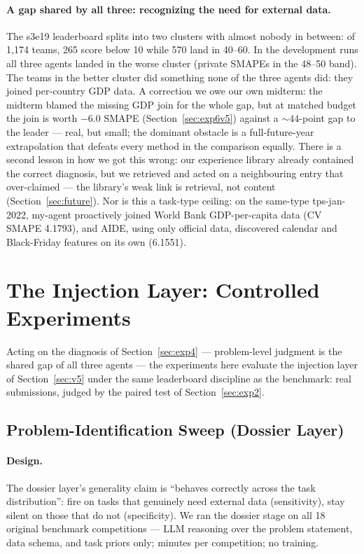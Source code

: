 \documentclass[11pt,a4paper]{article}
\begin{document}
\paragraph{A gap shared by all three: recognizing the need for external data.}
\label{sec:external}
The s3e19 leaderboard splits into two clusters with almost nobody in between: of 1{,}174 teams, 265 score below 10 while 570 land in 40--60. In the development runs all three agents landed in the worse cluster (private SMAPEs in the 48--50 band). The teams in the better cluster did something none of the three agents did: they joined per-country GDP data. A correction we owe our own midterm: the midterm blamed the missing GDP join for the whole gap, but at matched budget the join is worth $-6.0$ SMAPE (Section~\ref{sec:exp6v5}) against a ${\sim}44$-point gap to the leader --- real, but small; the dominant obstacle is a full-future-year extrapolation that defeats every method in the comparison equally. There is a second lesson in how we got this wrong: our experience library already contained the correct diagnosis, but we retrieved and acted on a neighbouring entry that over-claimed --- the library's weak link is retrieval, not content (Section~\ref{sec:future}). Nor is this a task-type ceiling: on the same-type tps-jan-2022, my-agent proactively joined World Bank GDP-per-capita data (CV SMAPE 4.1793), and AIDE, using only official data, discovered calendar and Black-Friday features on its own (6.1551).

\section{The Injection Layer: Controlled Experiments}

Acting on the diagnosis of Section~\ref{sec:exp4} --- problem-level judgment is the shared gap
of all three agents --- the experiments here evaluate the injection layer of
Section~\ref{sec:v5} under the same leaderboard discipline as the benchmark: real submissions,
judged by the paired test of Section~\ref{sec:exp2}.

\subsection{Problem-Identification Sweep (Dossier Layer)}
\label{sec:exp5v5}

\paragraph{Design.} The dossier layer's generality claim is ``behaves correctly across the task distribution'': fire on tasks that genuinely need external data (sensitivity), stay silent on those that do not (specificity). We ran the dossier stage on all 18 original benchmark competitions --- LLM reasoning over the problem statement, data schema, and task priors only; minutes per competition; no training.
\end{document}
